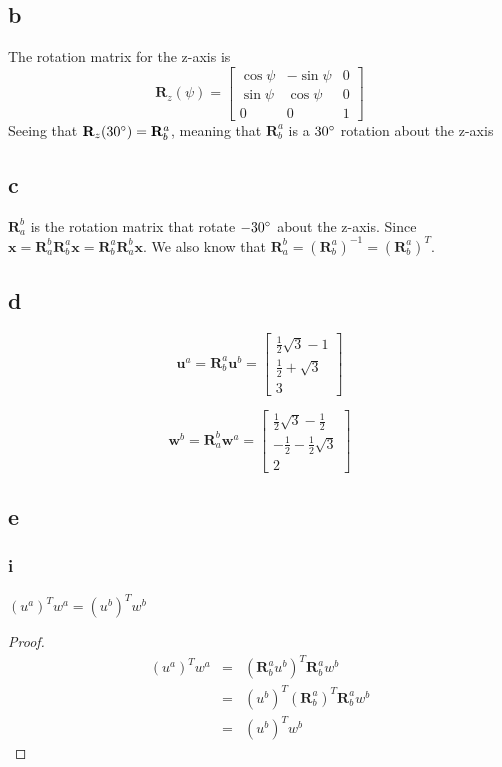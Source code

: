 \documentclass[11pt]{article}
\begin{document}
\subsection*{b}
The rotation matrix for the z-axis is
\[\mathbf{R}_z(\psi) = 
\begin{bmatrix}
\cos{\psi} & -\sin{\psi} & 0 \\
\sin{\psi} & \cos{\psi} & 0 \\
0 & 0 & 1
\end{bmatrix}
\]
Seeing that $\mathbf{R}_z(30\degree) = \mathbf{R}_b^a$, meaning that $\mathbf{R}_b^a$ is a $30\degree$ rotation about the z-axis

\subsection*{c}
$\mathbf{R}_a^b$ is the rotation matrix that rotate $-30\degree$ about the z-axis. Since $\mathbf{x} = \mathbf{R}_a^b \mathbf{R}_b^a \mathbf{x} = \mathbf{R}_b^a \mathbf{R}_a^b \mathbf{x}$. We also know that $\mathbf{R}_a^b = (\mathbf{R}_b^a)^{-1} = (\mathbf{R}_b^a)^{T}$.

\subsection*{d}
\[\mathbf{u}^a = \mathbf{R}_b^a \mathbf{u}^b = \begin{bmatrix}
\frac{1}{2} \sqrt{3} - 1 \\
\frac{1}{2} + \sqrt{3} \\
3
\end{bmatrix}
\]

\[\mathbf{w}^b = \mathbf{R}_a^b \mathbf{w}^a = \begin{bmatrix}
\frac{1}{2} \sqrt{3} - \frac{1}{2} \\
-\frac{1}{2} - \frac{1}{2} \sqrt{3} \\
2
\end{bmatrix}
\]

\subsection*{e}
\subsubsection*{i}
$(u^a)^T w^a = (u^b)^T w^b$
\begin{proof}
\begin{eqnarray*}
(u^a)^T w^a &=& (\mathbf{R}_b^a u^b)^T \mathbf{R}_b^a w^b \\
&=& (u^b)^T (\mathbf{R}_b^a)^T \mathbf{R}_b^a w^b \\
&=& (u^b)^T w^b
\end{eqnarray*}
\end{proof}
\end{document}

